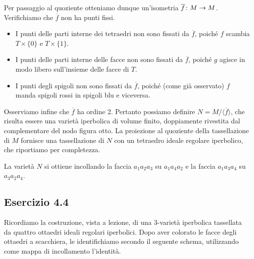 Per passaggio al quoziente otteniamo dunque un'isometria $\map{\overline{f}}{M}{M}$. Verifichiamo che $\overline{f}$ non ha punti fissi.
\begin{itemize}
\item I punti delle parti interne dei tetraedri non sono fissati da $\overline{f}$, poiché $f$ scambia $T\times\{0\}$ e $T\times\{1\}$.
\item I punti delle parti interne delle facce non sono fissati da $\overline{f}$, poiché $g$ agisce in modo libero sull'insieme delle facce di $T$.
\item I punti degli spigoli non sono fissati da $\overline{f}$, poiché (come già osservato) $f$ manda spigoli rossi in spigoli blu e viceversa.
\end{itemize}
Osserviamo infine che $\overline{f}$ ha ordine 2. Pertanto possiamo definire $N=M/\langle\overline{f}\rangle$, che risulta essere una varietà iperbolica di volume finito, doppiamente rivestita dal complementare del nodo figura otto. La proiezione al quoziente della tassellazione di $M$ fornisce una tassellazione di $N$ con un tetraedro ideale regolare iperbolico, che riportiamo per completezza.
\begin{center}
\end{center}
La varietà $N$ si ottiene incollando la faccia $a_1a_2a_3$ su $a_1a_4a_2$ e la faccia $a_1a_3a_4$ su $a_3a_2a_4$.

\newpage
\subsection*{Esercizio 4.4}
Ricordiamo la costruzione, vista a lezione, di una $3$-varietà iperbolica tassellata da quattro ottaedri ideali regolari iperbolici. Dopo aver colorato le facce degli ottaedri a scacchiera, le identifichiamo secondo il seguente schema, utilizzando come mappa di incollamento l'identità.

